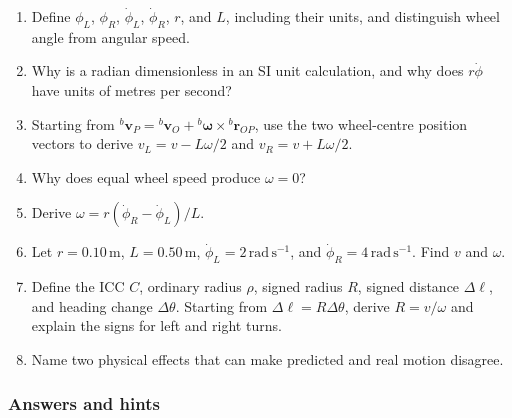\documentclass[
  australian,
  12pt,
  letterpaper,
  DIV=11,
  numbers=noendperiod,
  twoside]{scrreprt}
\providecommand{\tightlist}{%
  \setlength{\itemsep}{0pt}\setlength{\parskip}{0pt}}
\begin{document}
\begin{enumerate}
\def\labelenumi{\arabic{enumi}.}
\tightlist
\item
  Define \(\phi_L\), \(\phi_R\), \(\dot\phi_L\), \(\dot\phi_R\), \(r\),
  and \(L\), including their units, and distinguish wheel angle from
  angular speed.
\item
  Why is a radian dimensionless in an SI unit calculation, and why does
  \(r\dot\phi\) have units of metres per second?
\item
  Starting from
  \({}^{b}\mathbf v_P={}^{b}\mathbf v_O+{}^{b}\boldsymbol{\omega}\times{}^{b}\mathbf r_{OP}\),
  use the two wheel-centre position vectors to derive
  \(v_L=v-L\omega/2\) and \(v_R=v+L\omega/2\).
\item
  Why does equal wheel speed produce \(\omega=0\)?
\item
  Derive \(\omega=r(\dot\phi_R-\dot\phi_L)/L\).
\item
  Let \(r=0.10\,\mathrm m\), \(L=0.50\,\mathrm m\),
  \(\dot\phi_L=2\,\mathrm{rad\,s^{-1}}\), and
  \(\dot\phi_R=4\,\mathrm{rad\,s^{-1}}\). Find \(v\) and \(\omega\).
\item
  Define the ICC \(C\), ordinary radius \(\rho\), signed radius \(R\),
  signed distance \(\Delta\ell\), and heading change \(\Delta\theta\).
  Starting from \(\Delta\ell=R\Delta\theta\), derive \(R=v/\omega\) and
  explain the signs for left and right turns.
\item
  Name two physical effects that can make predicted and real motion
  disagree.
\end{enumerate}

\subsubsection*{Answers and hints}\label{answers-and-hints-7}
\end{document}

